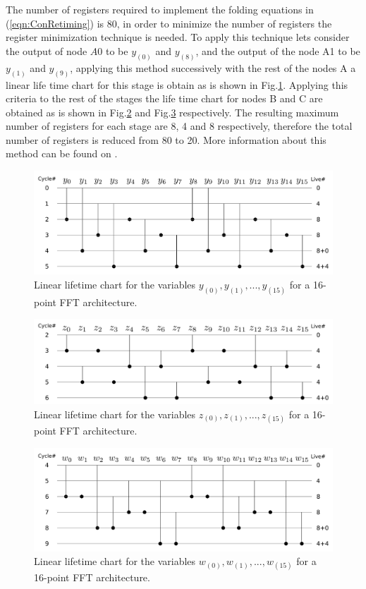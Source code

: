 \documentclass[journal,comsoc]{IEEEtran}
\begin{document}
The number of registers required to implement the folding equations in (\ref{eqn:ConRetiming}) is 80, in order to minimize the number of registers  the register minimization technique is needed. To apply this technique lets consider
the output of node $A0$ to be $y_{(0)}$ and $y_{(8)}$, and the output of the node A1 to be $y_{(1)}$ and $y_{(9)}$, applying this method successively with the rest of the nodes A a linear life time chart for this stage is obtain as is shown in Fig.\ref{fig:tab-life-a}. Applying this criteria to the rest of the stages the life time chart for nodes B and C are obtained as is shown in Fig.\ref{fig:tab-life-b} and Fig.\ref{fig:tab-life-c}  respectively. The resulting maximum number of registers for each stage are 8, 4 and 8 respectively, therefore the total number of registers is reduced from 80 to 20. More information about this method can be found on \cite{folding_parhi_book}.

\begin{figure}[t!]
\centering
 \includegraphics[width=\linewidth]{Diagramas/life_chart_a.png}
\caption{Linear lifetime chart for the variables $y_{(0)}, y_{(1)},...,y_{(15)}$ for a 16-point FFT architecture.}
\label{fig:tab-life-a}
\end{figure}
\begin{figure}[t!]
\centering
 \includegraphics[width=\linewidth]{Diagramas/life_chart_b.png}
\caption{Linear lifetime chart for the variables $z_{(0)}, z_{(1)},...,z_{(15)}$ for a 16-point FFT architecture.}
\label{fig:tab-life-b}
\end{figure}
\begin{figure}[t!]
\centering
 \includegraphics[width=\linewidth]{Diagramas/life_chart_c.png}
\caption{Linear lifetime chart for the variables $w_{(0)}, w_{(1)},...,w_{(15)}$ for a 16-point FFT architecture.}
\label{fig:tab-life-c}
\end{figure}
\end{document}
